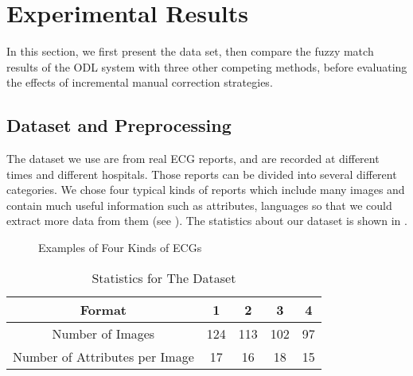 \section{Experimental Results}
\label{sec:eval}
In this section, we first present the data set, 
then compare the fuzzy match results
of the ODL system with three other competing methods, before evaluating the
effects of incremental manual correction strategies.

\subsection{Dataset and Preprocessing}
The dataset we use are from real ECG reports, and are recorded at 
different times and different hospitals. Those reports can be 
divided into several different categories. We chose four typical kinds 
of reports which include many images and contain much useful information 
such as attributes, languages so that we could extract more data 
from them (see ).
The statistics about our dataset is shown in . 

\begin{figure}[th]
\centering
{}
{}
{}
\caption{Examples of Four Kinds of ECGs}
\label{fig:dataset}
\end{figure}

\begin{table}[th]
\centering
\caption{Statistics for The Dataset}
\label{tab:statis}
\begin{tabular}{|c|c|c|c|c|}
\hline
Format & 1 & 2 & 3 & 4\\
\hline \hline
Number of Images & 124 & 113 & 102 & 97\\ 
\hline
Number of Attributes per Image & 17 & 16 & 18 & 15 \\
\hline
\end{tabular}
\end{table}

